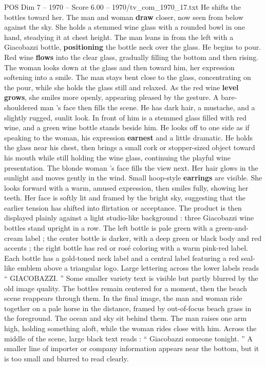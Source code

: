 \begin{textsample}{POS Dim 7 – 1970 – Score 6.00 – 1970/tv\_com\_1970\_17.txt}
He shifts the bottles toward her.
The man and woman \textbf{draw} closer, now seen from below against the sky.
She holds a stemmed wine glass with a rounded bowl in one hand, steadying it at chest height.
The man leans in from the left with a Giacobazzi bottle, \textbf{positioning} the bottle neck over the glass.
He begins to pour.
Red wine \textbf{flows} into the clear glass, gradually filling the bottom and then rising.
The woman looks down at the glass and then toward him, her expression softening into a smile.
The man stays bent close to the glass, concentrating on the pour, while she holds the glass still and relaxed.
As the red wine \textbf{level} \textbf{grows}, she smiles more openly, appearing pleased by the gesture.
A bare-shouldered man ’s face then fills the scene.
He has dark hair, a mustache, and a slightly rugged, sunlit look.
In front of him is a stemmed glass filled with red wine, and a green wine bottle stands beside him.
He looks off to one side as if speaking to the woman, his expression \textbf{earnest} and a little dramatic.
He holds the glass near his chest, then brings a small cork or stopper-sized object toward his mouth while still holding the wine glass, continuing the playful wine presentation.
The blonde woman ’s face fills the view next.
Her hair glows in the sunlight and moves gently in the wind.
Small hoop-style \textbf{earrings} are visible.
She looks forward with a warm, amused expression, then smiles fully, showing her teeth.
Her face is softly lit and framed by the bright sky, suggesting that the earlier tension has shifted into flirtation or acceptance.
The product is then displayed plainly against a light studio-like background : three Giacobazzi wine bottles stand upright in a row.
The left bottle is pale green with a green-and-cream label ; the center bottle is darker, with a deep green or black body and red accents ; the right bottle has red or rosé coloring with a warm pink-red label.
Each bottle has a gold-toned neck label and a central label featuring a red seal-like emblem above a triangular logo.
Large lettering across the lower labels reads “ GIACOBAZZI. ” Some smaller variety text is visible but partly blurred by the old image quality.
The bottles remain centered for a moment, then the beach scene reappears through them.
In the final image, the man and woman ride together on a pale horse in the distance, framed by out-of-focus beach grass in the foreground.
The ocean and sky sit behind them.
The man raises one arm high, holding something aloft, while the woman rides close with him.
Across the middle of the scene, large black text reads : “ Giacobazzi someone tonight. ” A smaller line of importer or company information appears near the bottom, but it is too small and blurred to read clearly.

\end{textsample}
